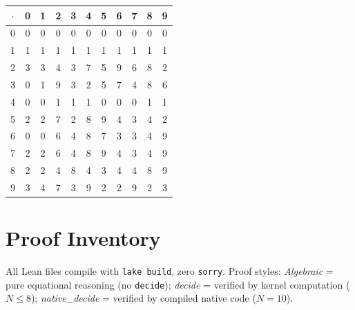 \documentclass[sigconf,screen]{acmart}
\newcommand{\dotop}{\cdot}
\theoremstyle{remark}
\begin{document}
\medskip
{\footnotesize
\begin{tabular}{c|cccccccccc}
$\dotop$ & 0 & 1 & 2 & 3 & 4 & 5 & 6 & 7 & 8 & 9 \\\hline
0 & 0 & 0 & 0 & 0 & 0 & 0 & 0 & 0 & 0 & 0 \\
1 & 1 & 1 & 1 & 1 & 1 & 1 & 1 & 1 & 1 & 1 \\
2 & 3 & 3 & 4 & 3 & 7 & 5 & 9 & 6 & 8 & 2 \\
3 & 0 & 1 & 9 & 3 & 2 & 5 & 7 & 4 & 8 & 6 \\
4 & 0 & 0 & 1 & 1 & 1 & 0 & 0 & 0 & 1 & 1 \\
5 & 2 & 2 & 7 & 2 & 8 & 9 & 4 & 3 & 4 & 2 \\
6 & 0 & 0 & 6 & 4 & 8 & 7 & 3 & 3 & 4 & 9 \\
7 & 2 & 2 & 6 & 4 & 8 & 9 & 4 & 3 & 4 & 9 \\
8 & 2 & 2 & 4 & 8 & 4 & 3 & 4 & 4 & 8 & 9 \\
9 & 3 & 4 & 7 & 3 & 9 & 2 & 2 & 9 & 2 & 3 \\
\end{tabular}}

\section{Proof Inventory}
\label{app:inventory}

All Lean files compile with \texttt{lake build}, zero \texttt{sorry}. Proof styles: \emph{Algebraic} = pure equational reasoning (no \texttt{decide}); \emph{decide} = verified by kernel computation ($N \leq 8$); \emph{native\_decide} = verified by compiled native code ($N = 10$).
\end{document}
